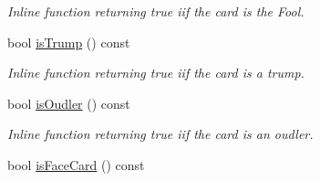 \begin{DoxyCompactItemize}
\begin{DoxyCompactList}\small\item\em \-Inline function returning true iif the card is the \-Fool. \end{DoxyCompactList}\item 
\hypertarget{classCard_ad9674d010674d0a536994147696abc6d}{bool \hyperlink{classCard_ad9674d010674d0a536994147696abc6d}{is\-Trump} () const }\label{classCard_ad9674d010674d0a536994147696abc6d}

\begin{DoxyCompactList}\small\item\em \-Inline function returning true iif the card is a trump. \end{DoxyCompactList}\item 
\hypertarget{classCard_a8ac4b04ac18721afdff8d504a7621a97}{bool \hyperlink{classCard_a8ac4b04ac18721afdff8d504a7621a97}{is\-Oudler} () const }\label{classCard_a8ac4b04ac18721afdff8d504a7621a97}

\begin{DoxyCompactList}\small\item\em \-Inline function returning true iif the card is an oudler. \end{DoxyCompactList}\item 
\hypertarget{classCard_ac8978fa4de9e59246381ebd2f9c5ecfc}{bool \hyperlink{classCard_ac8978fa4de9e59246381ebd2f9c5ecfc}{is\-Face\-Card} () const }\label{classCard_ac8978fa4de9e59246381ebd2f9c5ecfc}


\end{DoxyCompactItemize}
